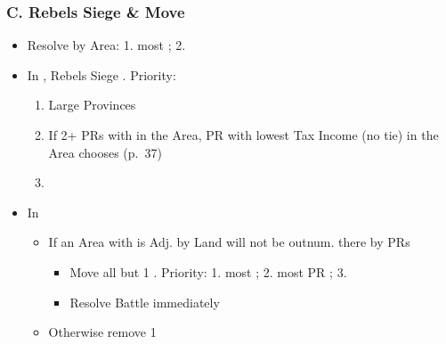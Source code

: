 \documentclass[10pt]{article}
\begin{document}
\subsubsection*{C. Rebels Siege \& Move}
\begin{itemize}
	\item Resolve by Area: 1. most \rebels; 2. \az
	\item In , Rebels Siege \unrest. Priority:
	\begin{enumerate}
		\item Large Provinces
		\item If 2+ PRs with \unrest in the Area, PR with lowest Tax Income (no tie) in the Area chooses (p.~37)
		\item \az
	\end{enumerate}
	\item In 
	\begin{itemize}
		\item If an Area with \unrest is Adj. by Land  \rebels will not be outnum. there by PRs
		\begin{itemize}
			\item Move all but 1 \rebel. Priority: 1. most \unrest; 2. most PR \towns; 3. \az
			\item Resolve Battle immediately
		\end{itemize}
		\item Otherwise remove 1\rebel
	\end{itemize}
\end{itemize}
\end{document}
